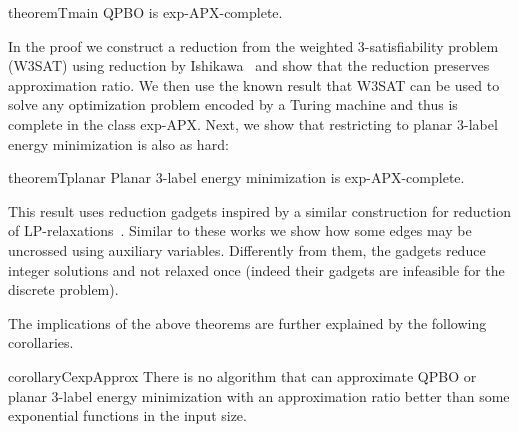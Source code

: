 \begin{restatable}{theorem}{Tmain}\label{th:main}
QPBO is exp-APX-complete.
\end{restatable}
\par
In the proof we construct a reduction from the weighted 3-satisfiability problem (W3SAT) using reduction by Ishikawa~\cite{ishikawa2011transformation} and show that the reduction preserves approximation ratio. We then use the known result that W3SAT can be used to solve any optimization problem encoded by a Turing machine and thus is complete in the class exp-APX.
Next, we show that restricting to planar 3-label energy minimization is also as hard:
\begin{restatable}{theorem}{Tplanar} \label{th:planar}
Planar 3-label energy minimization is exp-APX-complete.
\end{restatable}
This result uses reduction gadgets inspired by a similar construction for reduction of LP-relaxations~\cite{prusa2015hard,Prusa-Werner-15-Universality}. Similar to these works we show how some edges may be uncrossed using auxiliary variables. Differently from them, the gadgets reduce integer solutions and not relaxed once (indeed their gadgets are infeasible for the discrete problem).
\par
The implications of the above theorems are further explained by the following corollaries. %


\begin{restatable}{corollary}{CexpApprox}\label{C:exp-approx}
There is no algorithm that can approximate QPBO  or planar 3-label energy minimization with an approximation ratio better than some exponential functions in the input size.
\end{restatable}

